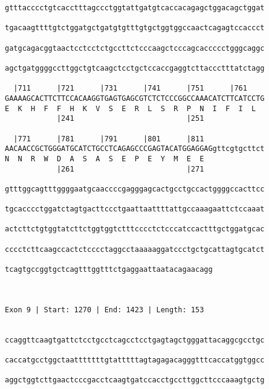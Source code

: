 \documentclass{article}
\begin{document}
\begin{Verbatim}
gtttacccctgtcacctttagccctggtattgatgtcaccacagagctggacagctggat
                                                            
tgacaagttttgtctggatgctgatgtgtttgtgctggtggccaactcagagtccaccct
                                                            
gatgcagacggtaactcctcctctgccttctcccaagctcccagcaccccctgggcaggc
                                                            
agctgatggggccttggctgtcaagctcctgctccaccgaggtcttaccctttatctagg
                                                            
  |711      |721      |731      |741      |751      |761    
GAAAAGCACTTCTTCCACAAGGTGAGTGAGCGTCTCTCCCGGCCAAACATCTTCATCCTG
E  K  H  F  F  H  K  V  S  E  R  L  S  R  P  N  I  F  I  L  
            |241                          |251              
  
  |771      |781      |791      |801      |811              
AACAACCGCTGGGATGCATCTGCCTCAGAGCCCGAGTACATGGAGGAGgttcgtgcttct
N  N  R  W  D  A  S  A  S  E  P  E  Y  M  E  E              
            |261                          |271              
  
gtttggcagtttggggaatgcaaccccgagggagcactgcctgccactggggccacttcc
                                                            
tgcacccctggatctagtgacttccctgaattaattttattgccaaagaattctccaaat
                                                            
actcttctgtggtatcttctggtggtctttcccctctcccatccactttgctggatgcac
                                                            
cccctcttcaagccactctcccctaggcctaaaaaggatccctgctgcattagtgcatct
                                                            
tcagtgccggtgctcagtttggtttctgaggaattaatacagaacagg
                                                
                                                
 
Exon 9 | Start: 1270 | End: 1423 | Length: 153


ccaggttcaagtgattctcctgcctcagcctcctgagtagctgggattacaggcgcctgc
                                                            
caccatgcctggctaatttttttgtatttttagtagagacagggtttcaccatggtggcc
                                                            
aggctggtcttgaactcccgacctcaagtgatccacctgccttggcttcccaaagtgctg
                                                            

\end{Verbatim}
\end{document}

